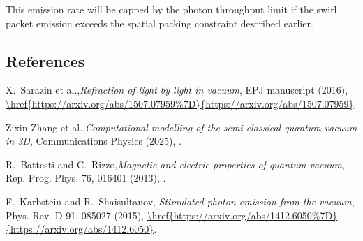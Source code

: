 This emission rate will be capped by the photon throughput limit  if the swirl packet emission exceeds the spatial packing constraint described earlier.





\subsection*{References}


\begin{thebibliography}{99}



X.~Sarazin et al.,\emph{Refraction of light by light in vacuum}, EPJ manuscript (2016), \url{\href{https://arxiv.org/abs/1507.07959%7D}{https://arxiv.org/abs/1507.07959}}.



Zixin Zhang et al.,\emph{Computational modelling of the semi-classical quantum vacuum in 3D}, Communications Physics (2025), .



R.~Battesti and C.~Rizzo,\emph{Magnetic and electric properties of quantum vacuum}, Rep. Prog. Phys. 76, 016401 (2013), .



F.~Karbstein and R.~Shaisultanov, \emph{Stimulated photon emission from the vacuum}, Phys. Rev. D 91, 085027 (2015), \url{\href{https://arxiv.org/abs/1412.6050%7D}{https://arxiv.org/abs/1412.6050}}.


\end{thebibliography}

